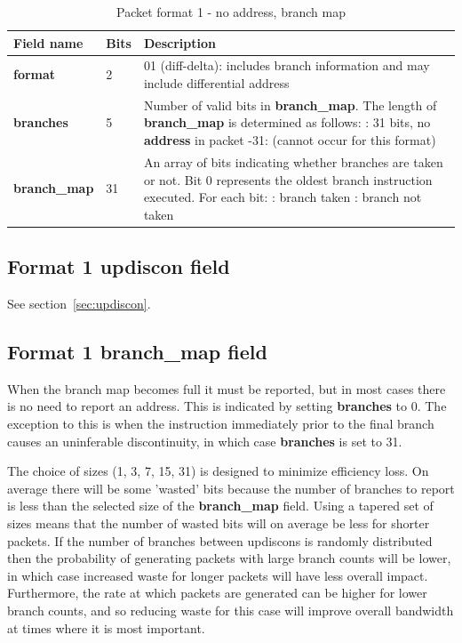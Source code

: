 \begin{table}[htp]
  \centering
  \caption{Packet format 1  - no address, branch map}
  \label{tab:te_inst1-noaddr-map}
  \begin{tabulary}{\textwidth}{|l|p{35mm}|p{90mm}|}
    \hline
    {\bf Field name} & {\bf Bits} & {\bf Description} \\
    \hline
    \textbf{format}	& 2	& 01 (diff-delta): includes branch information and may include differential address\\
    \hline
    \textbf{branches} & 5 & Number of valid bits in \textbf{branch\_map}. The length of \textbf{branch\_map} is determined as follows: :    31 bits, no \textbf{address} in packet -31: (cannot occur for this format) \\
    \hline
    \textbf{branch\_map} & 31 & 
                 An array of bits indicating whether branches are taken or not.\newline
    Bit 0 represents the oldest branch instruction executed.   For each bit: : branch taken : branch not taken \\
    \hline
  \end{tabulary}
\end{table}

\subsection{Format 1 \textbf{updiscon} field}

See section~\ref{sec:updiscon}.

\subsection{Format 1 \textbf{branch\_map} field}
When the branch map becomes full it must be reported, but in most cases there is no need to report an address.
This is indicated by setting \textbf{branches} to 0.  The exception to this is when the instruction immediately prior to 
the final branch causes an uninferable discontinuity, in which case \textbf{branches} is set to 31.

The choice of sizes (1, 3, 7, 15, 31) is designed to minimize efficiency loss.  On average there will be some 'wasted' bits 
because the number of branches to report is less than the selected size of the \textbf{branch\_map} field.
Using a tapered set of sizes means that the number of wasted bits will on average be less for shorter packets.
If the number of branches between updiscons is randomly distributed then the probability of generating packets with large
branch counts will be lower, in which case increased waste for longer packets will have less overall impact.
Furthermore, the rate at which packets are generated can be higher for lower branch counts, and so reducing
waste for this case will improve overall bandwidth at times where it is most important.

